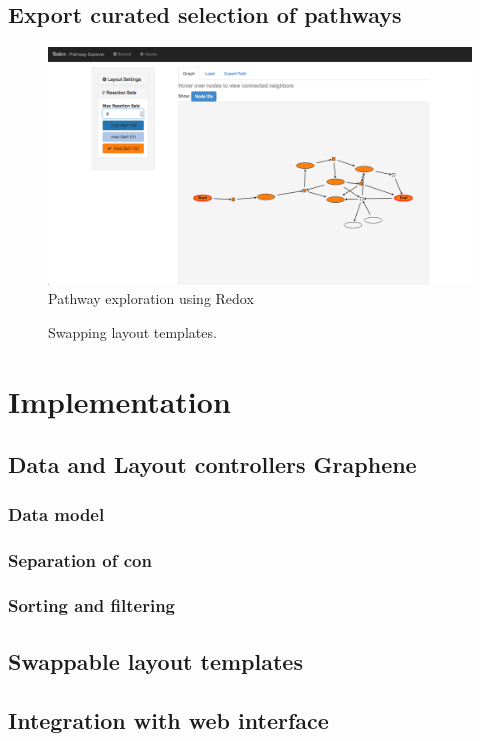 \subsection{Export curated selection of pathways}

\begin{figure}
  \centering
  \includegraphics[width=\textwidth,natwidth=610,natheight=642]{images/redox-ui.png}
  \caption{Pathway exploration using Redox}
  \label{Figure:redox}
\end{figure}


\begin{figure}
  \centering
  \caption{Swapping layout templates.}
  \label{Figure:redoxLayouts}
\end{figure}


\section{Implementation}
\subsection{Data and Layout controllers Graphene}
\subsubsection{Data model}
\subsubsection{Separation of con}
\subsubsection{Sorting and filtering}
\subsection{Swappable layout templates}
\subsection{Integration with web interface}
